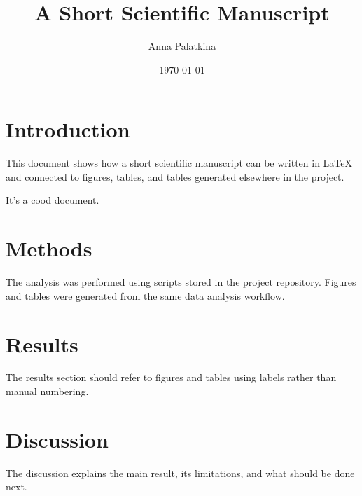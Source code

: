 \documentclass[11pt]{article}
\title{A Short Scientific Manuscript}
\author{Anna Palatkina}
\date{\today}
\begin{document}
\maketitle

\section{Introduction}

This document shows how a short scientific manuscript can be written in
\LaTeX{} and connected to figures, tables, and tables generated elsewhere
in the project. 

It's a cood document.

\section{Methods}

The analysis was performed using scripts stored in the project repository.
Figures and tables were generated from the same data analysis workflow.

\section{Results}

The results section should refer to figures and tables using labels rather than
manual numbering.

\section{Discussion}

The discussion explains the main result, its limitations, and what should be
done next.
\end{document}
